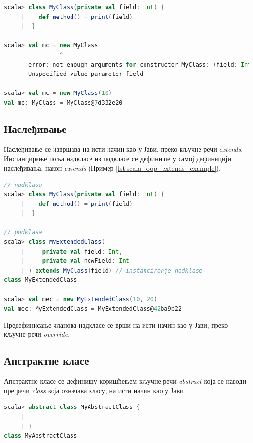 \documentclass[12pt,oneside]{memoir}
\begin{document}
\begin{lstlisting}[language=Scala, caption={Инстанцирање класе без подразумеваних вредности поља}, label={lst:scala_oop_field_explicit}]
scala> class MyClass(private val field: Int) {
     |    def method() = print(field)
     |  }

scala> val mc = new MyClass
                ^
       error: not enough arguments for constructor MyClass: (field: Int): MyClass.
       Unspecified value parameter field.
     
scala> val mc = new MyClass(10)
val mc: MyClass = MyClass@7d332e20
\end{lstlisting}

\subsection{Наслеђивање}
\label{subsec:scala_nasled}

Наслеђивање се извршава на исти начин као у Јави, преко кључне речи \textit{extends}. Инстанцирање поља надкласе из подкласе се дефинише у самој дефиницији наслеђивања, након \textit{extends} (Пример \ref{lst:scala_oop_extends_example}). \cite{scala_prog}

\begin{lstlisting}[language=Scala, caption={Наслеђивање у Скали}, label={lst:scala_oop_extends_example}]
// nadklasa
scala> class MyClass(private val field: Int) {
     |    def method() = print(field)
     |  }

// podklasa
scala> class MyExtendedClass(
     |     private val field: Int,
     |     private val newField: Int
     | ) extends MyClass(field) // instanciranje nadklase
class MyExtendedClass

scala> val mec = new MyExtendedClass(10, 20)
val mec: MyExtendedClass = MyExtendedClass@42ba9b22
\end{lstlisting}

Предефинисање чланова надкласе се врши на исти начин као у Јави, преко кључне речи \textit{override}.

\subsection{Апстрактне класе}
\label{subsec:scala_abs}

Апстрактне класе се дефинишу коришћењем кључне речи \textit{abstract} која се наводи пре речи \textit{class} која означава класу, на исти начин као у Јави. \cite{scala_prog}

\begin{lstlisting}[language=Scala, caption={Апстрактна класа у Скали}, label={lst:scala_oop_abstract_class_example}]
scala> abstract class MyAbstractClass {
     | 
     | }
class MyAbstractClass
\end{lstlisting}
\end{document}
